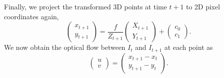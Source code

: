 Finally, we project the transformed 3D points at time $t+1$ to 2D pixel coordinates again,
\begin{equation}
\begin{pmatrix}
x_{t+1} \\ y_{t+1}
\end{pmatrix}
=
\frac{f}{Z_{t+1}}
\begin{pmatrix}
X_{t+1} \\ Y_{t+1}
\end{pmatrix}
+
\begin{pmatrix}
c_0 \\ c_1
\end{pmatrix}.
\end{equation}
We now obtain the optical flow between $I_t$ and $I_{t+1}$ at each point as
\begin{equation}
\begin{pmatrix}
u \\ v
\end{pmatrix}
=
\begin{pmatrix}
x_{t+1} - x_{t} \\ y_{t+1} - y_{t}
\end{pmatrix}.
\end{equation}
